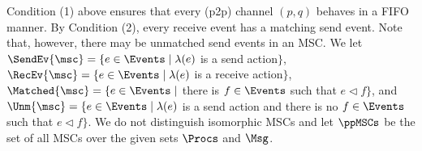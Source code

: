 \medskip

Condition (1) above ensures that every (p2p) channel $(p,q)$ behaves in a FIFO manner.
By Condition (2), every receive event has a matching send event.
Note that, however, there may be unmatched send events in an MSC.
We let
$\SendEv{\msc} = \{e \in \Events \mid \lambda(e)$ is a send
action$\}$,
$\RecEv{\msc} = \{e \in \Events \mid \lambda(e)$ is a receive
action$\}$,
$\Matched{\msc} = \{e \in \Events \mid$ there is $f \in \Events$
such that $e \lhd f\}$, and
$\Unm{\msc} = \{e \in \Events \mid \lambda(e)$ is a send
action and there is no $f \in \Events$ such that $e \lhd f\}$.
%
We do not distinguish isomorphic MSCs and
let $\ppMSCs$ be the set of all MSCs over the given sets $\Procs$ and $\Msg$.

\bigskip

